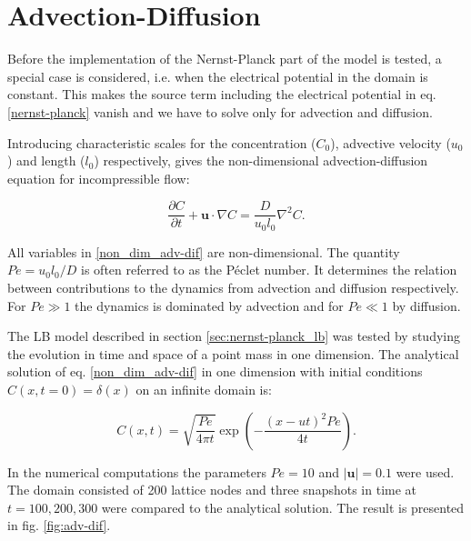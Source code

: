 \section{Advection-Diffusion}
Before the implementation of the Nernst-Planck part of the model is
tested, a special case is considered, i.e. when the electrical
potential in the domain is constant. This makes the source term
including the electrical potential in eq. \eqref{nernst-planck} vanish
and we have to solve only for advection and diffusion.

Introducing characteristic scales for the concentration ($C_0$),
advective velocity ($u_0$) and length ($l_0$) respectively, gives the
non-dimensional advection-diffusion equation for incompressible flow:

\begin{equation}\label{non_dim_adv-dif}
\frac{\partial C}{\partial t} + \mathbf{u} \cdot \nabla C = 
\frac{D}{u_0 l_0} \nabla^2C.
\end{equation}

All variables in \eqref{non_dim_adv-dif} are non-dimensional. The
quantity $Pe = u_0l_0/D$ is often referred to as the P\'{e}clet number. It
determines the relation between contributions to the
dynamics from advection and diffusion respectively. For $Pe \gg 1$ the
dynamics is dominated by advection and for $Pe \ll 1$ by diffusion. 

The LB model described in section \ref{sec:nernst-planck_lb} was
tested by studying the evolution in time and space of a point mass in
one dimension. The analytical solution of eq. \eqref{non_dim_adv-dif}
in one dimension with initial conditions $C(x, t = 0) = \delta(x)$ on
an infinite domain is:

\begin{equation}
C(x, t) = \sqrt{\frac{Pe}{4 \pi t}}\exp\left({-\frac{(x - ut)^2
    Pe}{4t}}\right).
\end{equation}

In the numerical computations the parameters $Pe = 10$ and
$|\mathbf{u}| = 0.1$ were used. The domain consisted of 200 lattice
nodes and three snapshots in time at $t = 100, 200, 300$ were compared
to the analytical solution. The result is presented in
fig. \ref{fig:adv-dif}.

